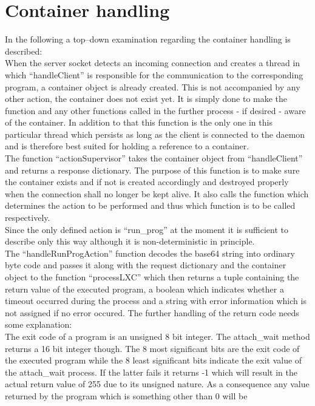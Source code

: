 \section{Container handling}

In the following a top--down examination regarding the container handling is described:\\
When the server socket detects an incoming connection and creates a thread in which ``handleClient'' is responsible
for the communication to the corresponding program, a container object is already created. This is not accompanied by
any other action, the container does not exist yet. It is simply done to make the function and any other functions
called in the further process - if desired - aware of the container.
In addition to that this function is the only one in this particular thread which persists as long as the
client is connected to the daemon and is therefore best suited for holding a reference to a container.\\
The function ``actionSupervisor'' takes the container object from ``handleClient'' and returns a response dictionary.
The purpose of this function is to make sure the container exists and if not is created accordingly and destroyed
properly when the connection shall no longer be kept alive. It also calls the function which determines the action
to be performed and thus which function is to be called respectively.\\
Since the only defined action is ``run\_prog'' at the moment it is sufficient to describe only this way although it is
non-deterministic in principle.\\
The ``handleRunProgAction'' function decodes the base64 string into ordinary byte code and passes it along with the
request dictionary and the container object to the function ``processLXC'' which then returns a tuple containing the return
value of the executed program, a boolean which indicates whether a timeout occurred during the process and a string
with error information which is not assigned if no error occured. The further handling of the return code needs some
explanation:\\
The exit code of a program is an unsigned 8 bit integer. The attach\_wait method returns a 16 bit integer though. The 8
most significant bits are the exit code of the executed program while the 8 least significant bits indicate the exit
value of the attach\_wait process. If the latter fails it returns -1 which will result in the actual return value of
255 due to its unsigned nature. As a consequence any value returned by the program which is something other than 0 will be

